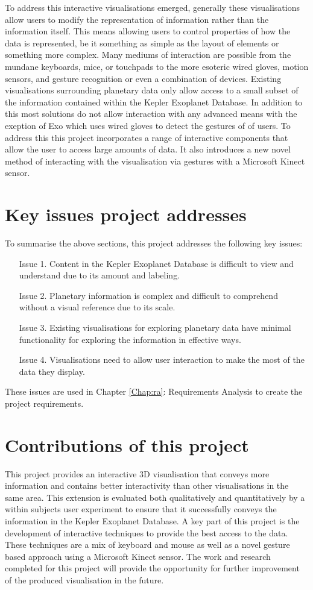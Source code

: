 To address
this interactive visualisations emerged, generally these visualisations allow
users to modify the representation of information rather than the information
itself. This means allowing users to control properties of how the data is
represented, be it something as simple as the layout of elements or something
more complex. Many mediums of interaction are possible from the mundane
keyboards, mice, or touchpads to the more esoteric wired gloves, motion sensors,
and gesture recognition or even a combination of devices. Existing
visualisations surrounding planetary data only allow access to a small subset of
the information contained within the Kepler Exoplanet Database. In addition to
this most solutions do not allow interaction with any advanced means with the
exeption of Exo \cite{exo} which uses wired gloves to detect the gestures of of
users. To address this this project incorporates a range of interactive
components that allow the user to access large amounts of data. It also
introduces a new novel method of interacting with the visualisation via gestures
with a Microsoft Kinect sensor.

\section{Key issues project addresses}
To summarise the above sections, this project addresses the following key
issues:
\begin{enumerate}
 \item[Issue 1.] Content in the Kepler Exoplanet Database is difficult to view
and
understand due to its amount and labeling.
 \item[Issue 2.] Planetary information is complex and difficult to comprehend
without
a visual reference due to its scale.
 \item[Issue 3.] Existing visualisations for exploring planetary data have
minimal
functionality for exploring the information in effective ways.
 \item[Issue 4.] Visualisations need to allow user interaction to make the most
of
the data they display.
\end{enumerate}
These issues are used in Chapter \ref{Chap:ra}: Requirements Analysis to create
the project requirements.

\section{Contributions of this project}
This project provides an interactive 3D visualisation that conveys more information and
contains better interactivity than other visualisations in the same area. This
extension is evaluated both qualitatively and quantitatively by a within subjects user experiment to ensure that it
successfully conveys the information in the Kepler Exoplanet Database.
A key part of this project is the development of interactive techniques to provide the best access to the data. These techniques are a mix of keyboard and
mouse as well as a novel gesture based approach using a Microsoft Kinect sensor.
The work and research completed for this project will provide the opportunity
for further improvement of the produced visualisation in the future.
